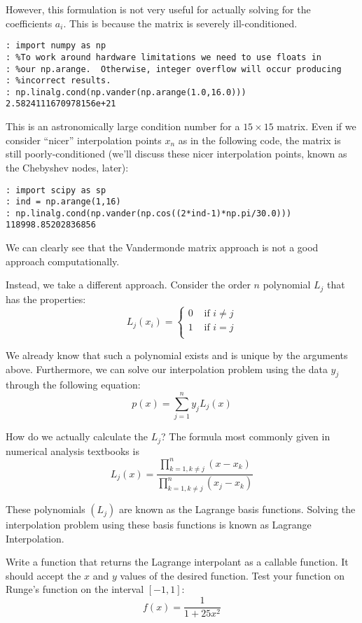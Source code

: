 However, this formulation is not very useful for actually solving for the coefficients $a_i$. This is because the matrix is severely ill-conditioned.

\begin{lstlisting}
: import numpy as np
: %To work around hardware limitations we need to use floats in
: %our np.arange.  Otherwise, integer overflow will occur producing
: %incorrect results.
: np.linalg.cond(np.vander(np.arange(1.0,16.0)))
2.5824111670978156e+21
\end{lstlisting}

This is an astronomically large condition number for a $15 \times 15$ matrix. Even if we consider ``nicer'' interpolation points $x_n$ as in the following code, the matrix is still poorly-conditioned (we'll discuss these nicer interpolation points, known as the Chebyshev nodes, later):

\begin{lstlisting}
: import scipy as sp
: ind = np.arange(1,16)
: np.linalg.cond(np.vander(np.cos((2*ind-1)*np.pi/30.0)))
118998.85202836856
\end{lstlisting}

We can clearly see that the Vandermonde matrix approach is not a good approach computationally.

Instead, we take a different approach. Consider the order $n$ polynomial $L_j$ that has the properties:
\[
L_j(x_i) = \begin{cases} 0 &\mbox{ if } i \neq j\\ 1 &\mbox{ if } i =j \\ \end{cases}
\]

We already know that such a polynomial exists and is unique by the arguments above. Furthermore, we can solve our interpolation problem using the data $y_j$ through the following equation:
\[
p(x) = \sum_{j=1}^n y_j L_j(x)
\]

How do we actually calculate the $L_j$? The formula most commonly given in numerical analysis textbooks is
\[
L_j(x) = \frac{\displaystyle\prod_{k=1, k \neq j}^n (x-x_k)}{\displaystyle\prod_{k=1, k \neq j}^n (x_j-x_k)}
\]

These polynomials $(L_j)$ are known as the Lagrange basis functions. Solving the interpolation problem using these basis functions is known as Lagrange Interpolation.

\begin{problem}
Write a function that returns the Lagrange interpolant as a callable function. It should accept the $x$ and $y$ values of the desired function. Test your function on Runge's function on the interval $[-1,1]$:
\[
f(x) = \frac{1}{1+25x^2}
\]
\end{problem}

